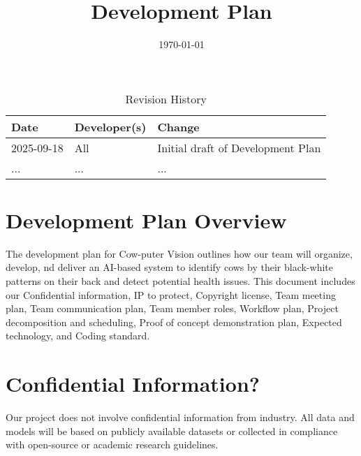 \documentclass{article}
\title{Development Plan\\\progname}
\author{\authname}
\date{\today}
\newcommand{\progname}{Cow-puter Vision} %
\begin{document}
\maketitle

\begin{table}[hp]
\caption{Revision History} \label{TblRevisionHistory}
\begin{tabularx}{\textwidth}{llX}
\toprule
\textbf{Date} & \textbf{Developer(s)} & \textbf{Change}\\
\midrule
2025-09-18 & All & Initial draft of Development Plan \\
... & ... & ...\\
\bottomrule
\end{tabularx}
\end{table}

\newpage{}


\section{Development Plan Overview}
The development plan for \progname{} outlines how our team will organize, develop, 
nd deliver an AI-based system to identify cows by their black-white patterns on their back 
and detect potential health issues. This document includes our Confidential information, 
IP to protect, Copyright license, Team meeting plan, Team communication plan, Team member 
roles, Workflow plan, Project decomposition and scheduling, Proof of concept demonstration 
plan, Expected technology, and Coding standard.


\section{Confidential Information?}


Our project does not involve confidential information from industry. 
All data and models will be based on publicly available datasets or 
collected in compliance with open-source or academic research guidelines.
\end{document}
